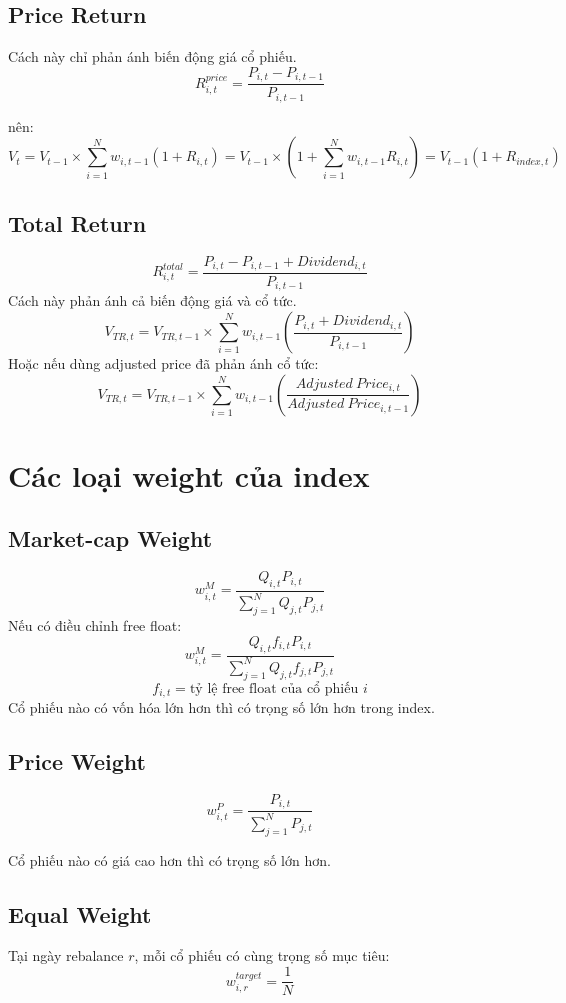 \subsection{Price Return}
Cách này chỉ phản ánh biến động giá cổ phiếu.
\[
R_{i,t}^{price}
=
\frac{P_{i,t}-P_{i,t-1}}{P_{i,t-1}}
\]

nên:
\[
V_{t}
= V_{t-1}\times\sum_{i=1}^{N}w_{i,t-1}(1+R_{i,t})
= V_{t-1}\times\left(1+\sum_{i=1}^{N}w_{i,t-1}R_{i,t}\right)
= V_{t-1}(1+R_{index,t})
\]

\subsection{Total Return}
\[
R_{i,t}^{total}
=
\frac{P_{i,t}-P_{i,t-1}+Dividend_{i,t}}{P_{i,t-1}}
\]
Cách này phản ánh cả biến động giá và cổ tức.
\[
V_{TR,t}
=
V_{TR,t-1}
\times
\sum_{i=1}^{N}
w_{i,t-1}
\left(
\frac{P_{i,t}+Dividend_{i,t}}{P_{i,t-1}}
\right)
\]
Hoặc nếu dùng adjusted price đã phản ánh cổ tức:
\[
V_{TR,t}
=
V_{TR,t-1}
\times
\sum_{i=1}^{N}
w_{i,t-1}
\left(
\frac{Adjusted\ Price_{i,t}}{Adjusted\ Price_{i,t-1}}
\right)
\]

\section{Các loại weight của index}
\label{sec:app_index_weights}
\subsection{Market-cap Weight}
\[
w_{i,t}^{M}
=
\frac{Q_{i,t}P_{i,t}}
{\sum_{j=1}^{N}Q_{j,t}P_{j,t}}
\]
Nếu có điều chỉnh free float:
\[
w_{i,t}^{M}
=
\frac{Q_{i,t}f_{i,t}P_{i,t}}
{\sum_{j=1}^{N}Q_{j,t}f_{j,t}P_{j,t}}
\]
\[
f_{i,t} = \text{tỷ lệ free float của cổ phiếu } i
\]
Cổ phiếu nào có vốn hóa lớn hơn thì có trọng số lớn hơn trong index.

\subsection{Price Weight}
\[
w_{i,t}^{P}
=
\frac{P_{i,t}}
{\sum_{j=1}^{N}P_{j,t}}
\]

Cổ phiếu nào có giá cao hơn thì có trọng số lớn hơn.

\subsection{Equal Weight}
Tại ngày rebalance \(r\), mỗi cổ phiếu có cùng trọng số mục tiêu:
\[
w_{i,r}^{target}
=
\frac{1}{N}
\]

